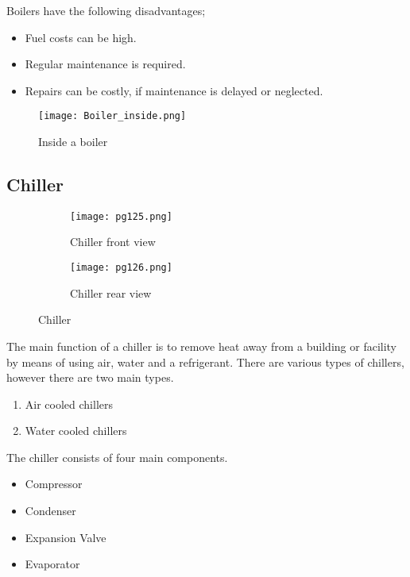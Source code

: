 \documentclass[a4paper,12pt]{article}
\begin{document}
			 \vspace{0.5cm}
			 Boilers have the following disadvantages;
			 \begin{itemize}
				\item Fuel costs can be high.
				\item Regular maintenance is required.
				\item Repairs can be costly, if maintenance is delayed or neglected.			 	 \end{itemize}
					  
			\begin{figure}[H]
				\centering				
					\texttt{[image: Boiler\_inside.png]}
				\caption{Inside a boiler}
				\label{fig:inside-a-boiler}
			\end{figure}
				
				
			
			
			\newpage
			\subsection{Chiller}
			
			\begin{figure}[H]
					\centering
					\begin{subfigure}{0.7\textwidth}						
						\centering						
						\texttt{[image: pg125.png]}
				 		\label{subfig:trane-front-pg125}
				 		\caption{Chiller front view}
				 	\end{subfigure}
				 	
				 	\begin{subfigure}{0.7\textwidth}
				 		\centering
						\texttt{[image: pg126.png]}				 									\label{subfig:trane-rear-pg126}
						\caption{Chiller rear view}
				 	\end{subfigure}
				 	\label{fig:chiller}
				 	\caption{Chiller}
				\end{figure}
				
			The main function of a chiller is to remove heat away from  a building or facility by means of using air, water and a refrigerant.
			There are various types of chillers, however there are two main types.
			
			\begin{enumerate}
				\item Air cooled chillers
				\item Water cooled chillers 
			\end{enumerate}	
			
			The chiller consists of four main components.
			\begin{itemize}
				\item Compressor
				\item Condenser
				\item Expansion Valve
				\item Evaporator
			\end{itemize}
			
\end{document}

